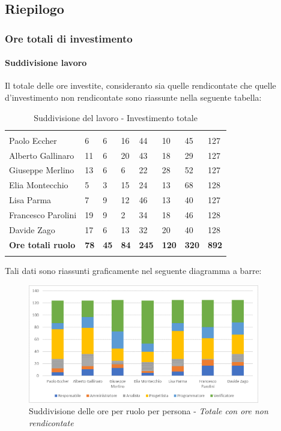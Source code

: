 	\subsection{Riepilogo}
		\subsubsection{Ore totali di investimento}
			\paragraph{Suddivisione lavoro} \Spazio
			Il totale delle ore investite, consideranto sia quelle rendicontate che quelle d'investimento non rendicontate sono riassunte nella seguente tabella:
					\begin{table}[H]
			\centering
			\begin{tabular}{|C{4cm}|C{0.8cm}|C{0.8cm}|C{0.8cm}|C{0.8cm}|C{0.8cm}|C{0.8cm}|C{3cm}|}
				 & & &&&&&\\
				Paolo Eccher 		& 6  & 6 & 16 & 44 & 10 & 45 & 127 \\
				\hline
				Alberto Gallinaro 	& 11 & 6 & 20 & 43 & 18 & 29 & 127 \\
				\hline
				Giuseppe Merlino 	& 13 & 6 & 6  & 22 & 28 & 52 & 127 \\
				\hline
				Elia Montecchio 	& 5 & 3 & 15 & 24 & 13 & 68 & 128 \\
				\hline
				Lisa Parma 			& 7 & 9 & 12 & 46 & 13 & 40 & 127 \\
				\hline
				Francesco Parolini 	& 19 & 9 & 2 & 34 & 18 & 46 & 128 \\
				\hline
				Davide Zago 		& 17 & 6 & 13 & 32 & 20 & 40 & 128 \\
				\hline
				\textbf{Ore totali ruolo}  & \textbf{78} & \textbf{45} & \textbf{84} & \textbf{245} & \textbf{120} & \textbf{320} & \textbf{892} \\
			\end{tabular}
			\caption{Suddivisione del lavoro - Investimento totale }
			\end{table}
		
			Tali dati sono riassunti graficamente nel seguente diagramma a barre:
			
			\begin{figure}[H] 
				\centering 
				\includegraphics[width=0.9\textwidth]{images/BarreTotale.png} 
				\caption{Suddivisione delle ore per ruolo per persona - \textit{Totale con ore non rendicontate}}
				\label{BarreTotale}
			\end{figure}

